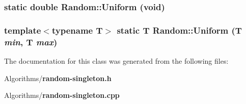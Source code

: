 \subsubsection{\setlength{\rightskip}{0pt plus 5cm}static double Random::Uniform (void)\hspace{0.3cm}{\tt  [inline, static]}}\label{classRandom_e2}


\subsubsection{\setlength{\rightskip}{0pt plus 5cm}template$<$typename T$>$ static T Random::Uniform (T {\em min}, T {\em max})\hspace{0.3cm}{\tt  [inline, static]}}\label{classRandom_e1}




The documentation for this class was generated from the following files:\begin{CompactItemize}
\item 
Algorithms/{\bf random-singleton.h}\item 
Algorithms/{\bf random-singleton.cpp}\end{CompactItemize}
